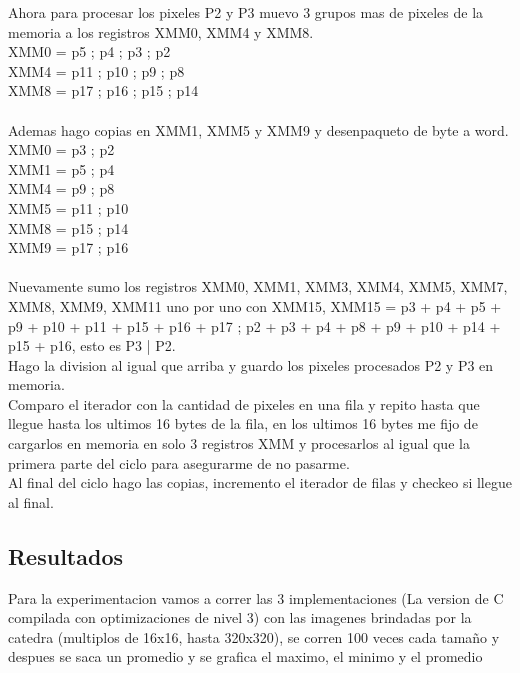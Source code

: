 Ahora para procesar los pixeles P2 y P3 muevo 3 grupos mas de pixeles de la memoria a los registros XMM0, XMM4 y XMM8. \\
	XMM0 = p5 ; p4 ; p3 ; p2 \\
	XMM4 = p11 ; p10 ; p9 ; p8 \\
	XMM8 = p17 ; p16 ; p15 ; p14 \\
\\
Ademas hago copias en XMM1, XMM5 y XMM9 y desenpaqueto de byte a word. \\
	XMM0 = p3 ; p2 \\
 	XMM1 = p5 ; p4 \\
	XMM4 = p9 ; p8 \\
	XMM5 = p11 ; p10 \\
 	XMM8 = p15 ; p14 \\
	XMM9 = p17 ; p16 \\
\\
Nuevamente sumo los registros XMM0, XMM1, XMM3, XMM4, XMM5, XMM7, XMM8, XMM9, XMM11 uno por uno con XMM15, XMM15 = p3 + p4 + p5 + p9 + p10 + p11 + p15 + p16 + p17 ; p2 + p3 + p4 + p8 + p9 + p10 + p14 + p15 + p16, esto es P3 | P2. \\

Hago la division al igual que arriba y guardo los pixeles procesados P2 y P3 en memoria. \\

Comparo el iterador con la cantidad de pixeles en una fila y repito hasta que llegue hasta los ultimos 16 bytes de la fila, en los ultimos 16 bytes me fijo de cargarlos en memoria en solo 3 registros XMM y procesarlos al igual que la primera parte del ciclo para asegurarme de no pasarme. \\

Al final del ciclo hago las copias, incremento el iterador de filas y checkeo si llegue al final. \\

\subsection{Resultados}
Para la experimentacion vamos a correr las 3 implementaciones (La version de C compilada con optimizaciones de nivel 3) con las imagenes brindadas por la catedra (multiplos de 16x16, hasta 320x320), se corren 100 veces cada tamaño y despues se saca un promedio y se grafica el maximo, el minimo y el promedio

